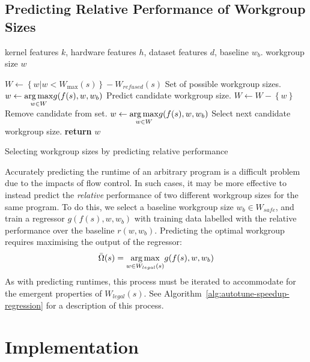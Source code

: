 \subsection{Predicting Relative Performance of Workgroup Sizes}\label{subsec:omnitune-ml-speedup}

\begin{algorithm}
  \begin{algorithmic}[1]
    \Require kernel features $k$, hardware features $h$, dataset features
    $d$, baseline $w_b$.
    \Ensure workgroup size $w$

    \State $W \leftarrow \left\{ w | w < W_{\max}(s) \right\} - W_{refused}(s)$
    \Comment Set of possible workgroup sizes.
    \State $w \leftarrow \underset{w \in W}{\operatorname*{arg\,max}} g(f(s), w,w_b)$
    \Comment Predict candidate workgroup size.
    \State $W \leftarrow W - \left\{ w \right\}$
    \Comment Remove candidate from set.
    \State $w \leftarrow \underset{w \in W}{\operatorname*{arg\,max}} g(f(s), w,w_b)$
    \Comment Select next candidate workgroup size.
    \EndWhile
    \State \textbf{return} $w$
  \end{algorithmic}
  \caption{Selecting workgroup sizes by predicting relative performance}
  \label{alg:autotune-speedup-regression}
\end{algorithm}

Accurately predicting the runtime of an arbitrary program is a
difficult problem due to the impacts of flow control. In such cases,
it may be more effective to instead predict the \emph{relative}
performance of two different workgroup sizes for the same program. To
do this, we select a baseline workgroup size $w_b \in W_{safe}$, and
train a regressor $g(f(s),w,w_b)$ with training data labelled with the
relative performance over the baseline $r(w, w_b)$. Predicting the
optimal workgroup requires maximising the output of the regressor:
%
\begin{equation}
  \bar{\Omega}(s) = \underset{w \in W_{legal}(s)}{\operatorname*{arg\,max}} g(f(s),w,w_b)
\end{equation}
%
As with predicting runtimes, this process must be iterated to
accommodate for the emergent properties of $W_{legal}(s)$. See
Algorithm~\ref{alg:autotune-speedup-regression} for a description of
this process.


\section{Implementation}

